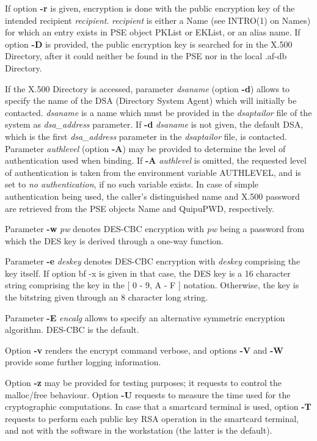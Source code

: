 If option {\bf -r} is given, encryption is done with the public encryption key
of the intended recipient {\em recipient}. {\em recipient} is either a Name (see INTRO(1) on Names)
for which an entry exists in PSE object PKList or EKList, or an alias name. If option {\bf -D}
is provided, the public encryption key is searched for in the X.500 Directory, after it could
neither be found in the PSE nor in the local .af-db Directory.
 
If the X.500 Directory is accessed, parameter {\em dsaname} (option {\bf -d}) allows to specify the name of the DSA (Directory System Agent) which
will initially be contacted. {\em dsaname} is a name which must be provided in the 
{\em dsaptailor} file of the system as {\em dsa\_address} parameter. If {\bf -d} {\em dsaname} is
not given, the default DSA, which is the first {\em dsa\_address} parameter in the {\em dsaptailor} 
file, is contacted.
Parameter {\em authlevel} (option {\bf -A}) may be provided to determine the level of authentication used when binding. If {\bf -A} {\em authlevel} is omitted, the requested 
level of authentication is taken from the environment variable AUTHLEVEL, and is set to {\em no 
authentication}, if no such variable exists.
In case of simple authentication being used, the caller's distinguished name and
X.500 password are retrieved from the PSE objects Name and QuipuPWD, respectively.
 
Parameter {\bf -w} {\em pw} denotes DES-CBC encryption with {\em pw} being a password from which the 
DES key 
is derived through a one-way function.
 
Parameter {\bf -e} {\em deskey} denotes DES-CBC encryption with {\em deskey} comprising the key itself.
If option {bf -x} is given in that case, the DES key is a 16 character string comprising
the key in the [ 0 - 9, A - F ] notation. Otherwise, the key is the bitstring given through
an 8 character long string.

Parameter {\bf -E} {\em encalg} allows to specify an alternative symmetric encryption algorithm.
DES-CBC is the default.

Option {\bf -v} renders the encrypt command verbose, and options {\bf -V} and {\bf -W} provide
some further logging information.

Option {\bf -z} may be provided for testing purposes; it requests to control the malloc/free behaviour.
Option {\bf -U} requests to measure the time used for the cryptographic computations. 
In case that a smartcard terminal is used, option {\bf -T} requests to perform each public key 
RSA operation in the smartcard terminal, and not with the software in the workstation 
(the latter is the default). 
\\ [1em]

